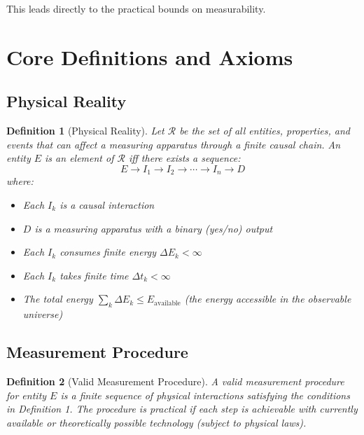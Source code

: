 \documentclass[aps,preprint,showpacs,showkeys]{revtex4}
\newtheorem{definition}{Definition}
\begin{document}
This leads directly to the practical bounds on measurability.

\section{Core Definitions and Axioms}

\subsection{Physical Reality}

\begin{definition}[Physical Reality]
Let $\mathcal{R}$ be the set of all entities, properties, and events that
can affect a measuring apparatus through a finite causal chain. An entity $E$
is an element of $\mathcal{R}$ iff there exists a sequence: 
\begin{equation}
E \rightarrow I_1 \rightarrow I_2 \rightarrow \cdots \rightarrow I_n
\rightarrow D
\end{equation}
where:

\begin{itemize}
\item Each $I_k$ is a causal interaction

\item $D$ is a measuring apparatus with a binary (yes/no) output

\item Each $I_k$ consumes finite energy $\Delta E_k < \infty$

\item Each $I_k$ takes finite time $\Delta t_k < \infty$

\item The total energy $\sum_k \Delta E_k \le E_{\text{available}}$ (the
energy accessible in the observable universe)
\end{itemize}
\end{definition}

\subsection{Measurement Procedure}

\begin{definition}[Valid Measurement Procedure]
A valid measurement procedure for entity $E$ is a finite sequence of
physical interactions satisfying the conditions in Definition 1. The
procedure is \emph{practical} if each step is achievable with currently
available or theoretically possible technology (subject to physical laws).
\end{definition}
\end{document}
